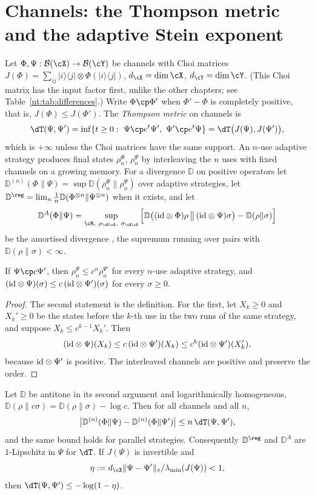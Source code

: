 \section{Channels: the Thompson metric and the adaptive Stein exponent}\label{shA:sec:channels}

Let $\Phi,\Psi:\mathcal B(\cX)\to\mathcal B(\cY)$ be channels with Choi matrices $J(\Phi)=\sum_{ij}|i\rangle\langle j|\otimes\Phi(|i\rangle\langle j|)$, $d_\cX=\dim\cX$, $d_\cY=\dim\cY$. %
(This Choi matrix has the input factor first, unlike the other chapters; see Table~\ref{nt:tab:differences}.) Write $\Phi\cp\Phi'$ when $\Phi'-\Phi$ is completely positive, that is, $J(\Phi)\le J(\Phi')$. The \emph{Thompson metric} on channels is
\[
\dT(\Psi,\Psi')=\inf\{t\ge0:\ \Psi\cp e^t\Psi',\ \Psi'\cp e^t\Psi\}=\dT\big(J(\Psi),J(\Psi')\big),
\]
which is $+\infty$ unless the Choi matrices have the same support. An $n$-use adaptive strategy produces final states $\rho^\Phi_n$, $\rho^\Psi_n$ by interleaving the $n$ uses with fixed channels on a growing memory. For a divergence $\mathbb D$ on positive operators let $\mathbb D^{(n)}(\Phi\|\Psi)=\sup\mathbb D(\rho^\Phi_n\|\rho^\Psi_n)$ over adaptive strategies, let $\mathbb D^\reg=\lim_n\frac1n\mathbb D(\Phi^{\otimes n}\|\Psi^{\otimes n})$ when it exists, and let
\[
\mathbb D^A(\Phi\|\Psi)=\sup_{\cR,\ \rho_{\cR\cX},\ \sigma_{\cR\cX}}\Big[\mathbb D\big((\id\otimes\Phi)\rho\,\big\|\,(\id\otimes\Psi)\sigma\big)-\mathbb D(\rho\|\sigma)\Big]
\]
be the amortised divergence \cite{WBHK2020}, the supremum running over pairs with $\mathbb D(\rho\|\sigma)<\infty$.

\begin{lemma}\label{shA:lem:order}
If $\Psi\cp c\Psi'$, then $\rho^\Psi_n\le c^n\rho^{\Psi'}_n$ for every $n$-use adaptive strategy, and $(\mathrm{id}\otimes\Psi)(\sigma)\le c\,(\mathrm{id}\otimes\Psi')(\sigma)$ for every $\sigma\ge0$.
\end{lemma}

\begin{proof}
The second statement is the definition. For the first, let $X_k\ge0$ and $X_k'\ge0$ be the states before the $k$-th use in the two runs of the same strategy, and suppose $X_k\le c^{k-1}X_k'$. Then
\[
(\mathrm{id}\otimes\Psi)(X_k)\le c\,(\mathrm{id}\otimes\Psi')(X_k)\le c^k(\mathrm{id}\otimes\Psi')(X_k'),
\]
because $\mathrm{id}\otimes\Psi'$ is positive. The interleaved channels are positive and preserve the order.
\end{proof}

\begin{theorem}\label{shA:thm:thompson}
Let $\mathbb D$ be antitone in its second argument and logarithmically homogeneous, $\mathbb D(\rho\|c\sigma)=\mathbb D(\rho\|\sigma)-\log c$. Then for all channels and all $n$,
\[
\big|\mathbb D^{(n)}(\Phi\|\Psi)-\mathbb D^{(n)}(\Phi\|\Psi')\big|\le n\,\dT(\Psi,\Psi'),
\]
and the same bound holds for parallel strategies. Consequently $\mathbb D^\reg$ and $\mathbb D^A$ are $1$-Lipschitz in $\Psi$ for $\dT$. If $J(\Psi)$ is invertible and
\[
\eta:=d_\cX\|\Psi-\Psi'\|_\diamond/\lambda_{\min}(J(\Psi))<1,
\]
then $\dT(\Psi,\Psi')\le-\log(1-\eta)$.
\end{theorem}

